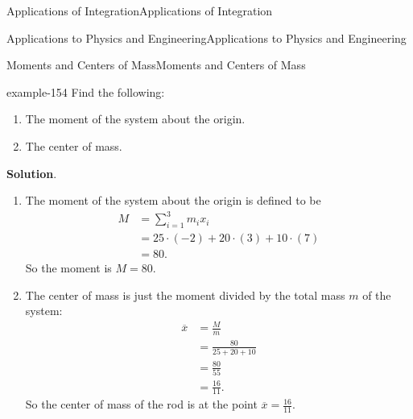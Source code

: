 \documentclass[10pt,]{book}
\numberwithin{equation}{section}
\newcommand{\amp}{&}
\begin{document}
\begin{chapterptx}{Applications of Integration}{}{Applications of Integration}{}{}
\begin{sectionptx}{Applications to Physics and Engineering}{}{Applications to Physics and Engineering}{}{}
\begin{subsectionptx}{Moments and Centers of Mass}{}{Moments and Centers of Mass}{}{}
\begin{example}{}{example-154}
Find the following: \leavevmode%
\begin{enumerate}
\item\hypertarget{li-55}{}\hypertarget{p-694}{}%
The moment of the system about the origin.%
\item\hypertarget{li-56}{}\hypertarget{p-695}{}%
The center of mass.%
\end{enumerate}
%
\par\smallskip%
\noindent\textbf{Solution}.\hypertarget{solution-150}{}\quad%
\leavevmode%
\begin{enumerate}
\item\hypertarget{li-57}{}\hypertarget{p-696}{}%
The moment of the system about the origin is defined to be%
\begin{align*}
M \amp= \sum_{i=1}^{3}m_{i}x_{i}\\
\amp= 25\cdot(-2)+20\cdot(3)+10\cdot(7)\\
\amp= 80.
\end{align*}
So the moment is \(M = 80\).%
\item\hypertarget{li-58}{}\hypertarget{p-697}{}%
The center of mass is just the moment divided by the total mass \(m\) of the system:%
\begin{align*}
\overline{x}\amp= \frac{M}{m}\\
\amp= \frac{80}{25+20+10}\\
\amp= \frac{80}{55}\\
\amp= \frac{16}{11}.
\end{align*}
So the center of mass of the rod is at the point \(\overline{x} = \frac{16}{11}\).%
\end{enumerate}
\end{example}
\begin{figure}
\centering
{
}
\end{figure}
\end{subsectionptx}
\end{sectionptx}
\end{chapterptx}
\end{document}
